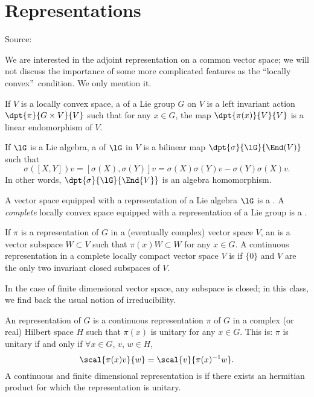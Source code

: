 \section{Representations}
Source: \cite{Lie_groups}

We are interested in the adjoint representation on a common vector space; we will not discuss the importance of some more complicated features as the ``locally convex''\ condition. We only mention it.

\begin{definition}
If $V$ is a locally convex space, a  of a Lie group $G$ on $V$ is a left invariant action $\dpt{\pi}{G\times V}{V}$ such that for any $x\in G$, the map $\dpt{\pi(x)}{V}{V}$ is a linear endomorphism of $V$.
\end{definition}

If $\lG$ is a Lie algebra, a  of $\lG$ in $V$ is a bilinear map $\dpt{\sigma}{\lG}{\End(V)}$ such that
\begin{equation}
    \sigma([X,Y])v=[\sigma(X),\sigma(Y)]v=\sigma(X)\sigma(Y)v-\sigma(Y)\sigma(X)v.
\end{equation}
In other words, $\dpt{\sigma}{\lG}{\End{V}}$ is an algebra homomorphism.

A vector space equipped with a representation of a Lie algebra $\lG$ is a . A \emph{complete} locally convex space equipped with a representation of a Lie group is a .

If $\pi$ is a representation of $G$ in a (eventually complex) vector space $V$, an  is a vector subspace $W\subset V$ such that $\pi(x)W\subset W$ for any $x\in G$. A continuous representation in a complete locally compact vector space $V$ is  if $\{0\}$ and $V$ are the only two invariant closed subspaces of $V$.

In the case of finite dimensional vector space, any subspace is closed; in this class, we find back the usual notion of irreducibility.

An  representation of $G$ is a continuous representation $\pi$ of $G$ in a complex (or real) Hilbert space $H$ such that $\pi(x)$ is unitary for any $x\in G$. This is: $\pi$ is unitary if and only if $\forall x\in G$, $v$, $w\in H$,
\begin{equation}
\scal{\pi(x)v}{w}=\scal{v}{\pi(x)^{-1} w}.
\end{equation}
A continuous and finite dimensional representation is  if there exists an hermitian product for which the representation is unitary.

